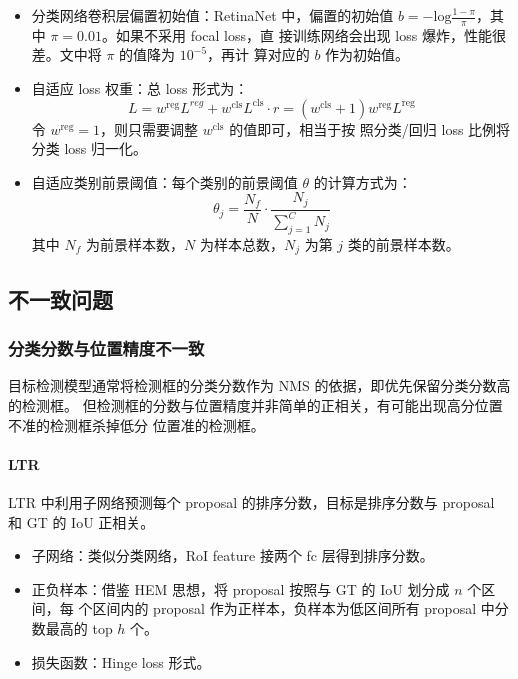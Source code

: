 \begin{itemize}
  \item 分类网络卷积层偏置初始值：RetinaNet 中，偏置的初始值 $b =
    -\mathrm{log}\frac{1-\pi}{\pi}$，其中 $\pi=0.01$。如果不采用 focal loss，直
    接训练网络会出现 loss 爆炸，性能很差。文中将 $\pi$ 的值降为 $10^{-5}$，再计
    算对应的 $b$ 作为初始值。
  \item 自适应 loss 权重：总 loss 形式为：
    \begin{equation}
    L = w^{\mathrm{reg}} L^{reg} +
    w^{\mathrm{cls}} L^{\mathrm{cls}} \cdot r = \left( w^{\mathrm{cls}} + 1
    \right) w^{\mathrm{reg}} L^{\mathrm{reg}}
    \end{equation}
    令 $w^{\mathrm{reg}} = 1$，则只需要调整 $w^{\mathrm{cls}}$ 的值即可，相当于按
    照分类/回归 loss 比例将分类 loss 归一化。
  \item 自适应类别前景阈值：每个类别的前景阈值 $\theta$ 的计算方式为：
    \begin{equation}
      \theta_j = \frac{N_f}{N} \cdot \frac{N_j}{\sum_{j=1}^{C} N_j}
    \end{equation}
    其中 $N_f$ 为前景样本数，$N$ 为样本总数，$N_j$ 为第 $j$ 类的前景样本数。
\end{itemize}

\subsection{不一致问题}
\subsubsection{分类分数与位置精度不一致}
目标检测模型通常将检测框的分类分数作为 NMS 的依据，即优先保留分类分数高的检测框。
但检测框的分数与位置精度并非简单的正相关，有可能出现高分位置不准的检测框杀掉低分
位置准的检测框。

\paragraph{LTR}
LTR 中利用子网络预测每个 proposal 的排序分数，目标是排序分数与 proposal 和 GT 的
IoU 正相关。

\begin{itemize}
  \item 子网络：类似分类网络，RoI feature 接两个 fc 层得到排序分数。
  \item 正负样本：借鉴 HEM 思想，将 proposal 按照与 GT 的 IoU 划分成 $n$ 个区间，每
    个区间内的 proposal 作为正样本，负样本为低区间所有 proposal 中分数最高的 top
    $h$ 个。
  \item 损失函数：Hinge loss 形式。
\end{itemize}


